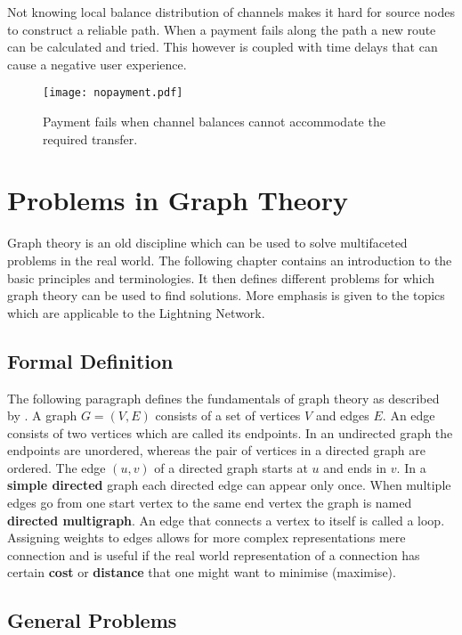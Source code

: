 \documentclass[final]{fhnwreport}       %
\begin{document}
Not knowing local balance distribution of channels makes it hard for source nodes to construct a reliable path. When a payment fails along the path a new route can be calculated and tried. This however is coupled with time delays that can cause a negative user experience.

\begin{figure}[H]
\centering
\texttt{[image: nopayment.pdf]}
\caption{Payment fails when channel balances cannot accommodate the required transfer.}
\label{fig:nopayment}
\end{figure}

\section{Problems in Graph Theory}
Graph theory is an old discipline which can be used to solve multifaceted problems in the real world. The following chapter contains an introduction to the basic principles and terminologies. It then defines different problems for which graph theory can be used to find solutions. More emphasis is given to the topics which are applicable to the Lightning Network.

\subsection{Formal Definition}\label{subsec:formal}
The following paragraph defines the fundamentals of graph theory as described by \citet{rosen_discrete_2012}.
A graph $G=(V,E)$ consists of a set of vertices $V$ and edges $E$. An edge consists of two vertices which are called its endpoints. In an undirected graph the endpoints are unordered, whereas the pair of vertices in a directed graph are ordered. The edge $(u, v)$ of a directed graph starts at $u$ and ends in $v$. In a \textbf{simple directed} graph each directed edge can appear only once. When multiple edges go from one start vertex to the same end vertex the graph is named \textbf{directed multigraph}. An edge that connects a vertex to itself is called a loop. Assigning weights to edges allows for more complex representations mere connection and is useful if the real world representation of a connection has certain \textbf{cost} or \textbf{distance} that one might want to minimise (maximise). 

\subsection{General Problems}
\end{document}
